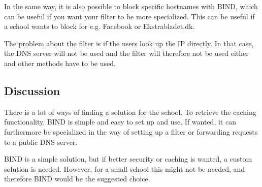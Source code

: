 \documentclass[Preamble]{subfiles}
\begin{document}
In the same way, it is also possible to block specific hostnames with BIND, which can be useful if you want your filter to be more specialized. 
This can be useful if a school wants to block for e.g. Facebook or Ekstrabladet.dk.

The problem about the filter is if the users look up the IP directly. 
In that case, the DNS server will not be used and the filter will therefore not be used either and other methods have to be used.



\subsection{Discussion}
There is a lot of ways of finding a solution for the school. 
To retrieve the caching functionality, BIND is simple and easy to set up and use. 
If wanted, it can furthermore be specialized in the way of setting up a filter or forwarding requests to a public DNS server.  

BIND is a simple solution, but if better security or caching is wanted, a custom solution is needed. However, for a small school this might not be needed, and therefore BIND would be the suggested choice.
\end{document}
